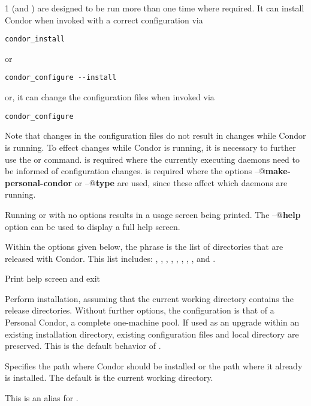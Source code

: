 \begin{ManPage}{\label{man-condor-configure}}{1}
 (and ) are designed to be run more
than one time where required.
It can install Condor when invoked with a correct configuration via
\begin{verbatim}
condor_install
\end{verbatim}
or 
\begin{verbatim}
condor_configure --install
\end{verbatim}
or, it can change the configuration files when invoked via
\begin{verbatim}
condor_configure
\end{verbatim}
Note that changes in the configuration files do not result
in changes while Condor is running.
To effect changes while Condor is running,
it is necessary to further use the  or 
command.
  is required where the currently executing
daemons need to be informed of configuration changes.
 is required where the options
\verb@--@\textbf{make-personal-condor} or
\verb@--@\textbf{type}
are used, since these affect which daemons are running.

Running  or  with no options results
in a usage screen being printed.
The \verb@--@\textbf{help} option can be used to display a full help screen.

Within the options given below, 
the phrase  is the list of directories that are
released with Condor.  This list includes: 
, , , ,
, , , ,
 and .

\begin{Options}
   {Print help screen and exit}

   {Perform installation, assuming that
    the current working directory contains the release directories.
    Without further options, the configuration is that of
    a Personal Condor, a complete one-machine pool.
    If used as an 
    upgrade within an existing installation directory, existing 
    configuration files and local directory are preserved.  This
    is the default behavior of . }

   {Specifies the path
    where Condor should be installed or the path where it already is
    installed. The default is the current working directory.}

   {This is an alias for
    .}


\end{Options}
\end{ManPage}
